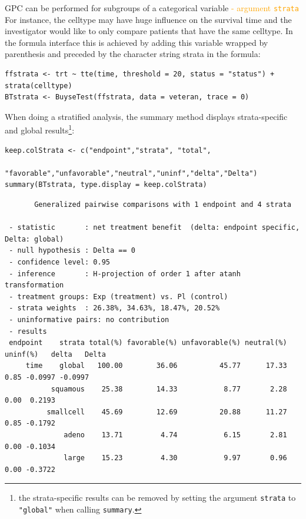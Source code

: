 \documentclass[12pt]{article}
\begin{document}
GPC can be performed for subgroups of a categorical variable \hfill
\textcolor{orange}{- argument \texttt{strata}} \newline For
instance, the celltype may have huge influence on the survival time
and the investigator would like to only compare patients that have the
same celltype. In the formula interface this is achieved by adding this
variable wrapped by parenthesis and preceded by the character string
strata in the formula:
\lstset{language=r,label= ,caption= ,captionpos=b,numbers=none}
\begin{lstlisting}
ffstrata <- trt ~ tte(time, threshold = 20, status = "status") + strata(celltype)
BTstrata <- BuyseTest(ffstrata, data = veteran, trace = 0)
\end{lstlisting}

When doing a stratified analysis, the summary method displays
strata-specific and global results\footnote{the strata-specific results can
be removed by setting the argument \texttt{strata} to \texttt{"global"} when calling
\texttt{summary}.}:
\lstset{language=r,label= ,caption= ,captionpos=b,numbers=none}
\begin{lstlisting}
keep.colStrata <- c("endpoint","strata", "total",
                    "favorable","unfavorable","neutral","uninf","delta","Delta")
summary(BTstrata, type.display = keep.colStrata)
\end{lstlisting}

\begin{verbatim}
       Generalized pairwise comparisons with 1 endpoint and 4 strata

 - statistic       : net treatment benefit  (delta: endpoint specific, Delta: global) 
 - null hypothesis : Delta == 0 
 - confidence level: 0.95 
 - inference       : H-projection of order 1 after atanh transformation 
 - treatment groups: Exp (treatment) vs. Pl (control) 
 - strata weights  : 26.38%, 34.63%, 18.47%, 20.52% 
 - uninformative pairs: no contribution
 - results
 endpoint    strata total(%) favorable(%) unfavorable(%) neutral(%) uninf(%)   delta   Delta
     time    global   100.00        36.06          45.77      17.33     0.85 -0.0997 -0.0997
           squamous    25.38        14.33           8.77       2.28     0.00  0.2193        
          smallcell    45.69        12.69          20.88      11.27     0.85 -0.1792        
              adeno    13.71         4.74           6.15       2.81     0.00 -0.1034        
              large    15.23         4.30           9.97       0.96     0.00 -0.3722
\end{verbatim}
\end{document}
